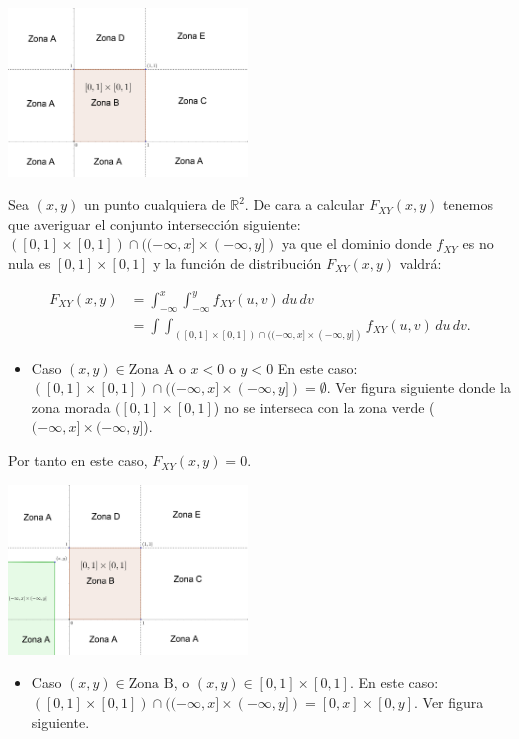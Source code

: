 \documentclass[
  letterpaper,
  DIV=11,
  numbers=noendperiod]{scrreprt}
\providecommand{\tightlist}{%
  \setlength{\itemsep}{0pt}\setlength{\parskip}{0pt}}\usepackage{longtable,booktabs,array}
\begin{document}
\includegraphics[width=2.5in,height=\textheight]{Images/VaUniformeBidi2.png}

Sea \((x,y)\) un punto cualquiera de \(\mathbb{R}^2\). De cara a
calcular \(F_{XY}(x,y)\) tenemos que averiguar el conjunto intersección
siguiente: \(([0,1]\times [0,1])\cap ((-\infty,x]\times (-\infty,y])\)
ya que el dominio donde \(f_{XY}\) es no nula es \([0,1]\times [0,1]\) y
la función de distribución \(F_{XY}(x,y)\) valdrá:

\[
\begin{array}{rl}
F_{XY}(x,y)&=\int_{-\infty}^x\int_{-\infty}^y f_{XY}(u,v)\,du\,dv\\ &=
\int\int_{([0,1]\times [0,1])\cap ((-\infty,x]\times (-\infty,y])} f_{XY}(u,v)\,du\,dv.
\end{array}
\]

\begin{itemize}
\tightlist
\item
  Caso \((x,y)\in \mbox{Zona A}\) o \(x<0\) o \(y<0\) En este caso:
  \(([0,1]\times [0,1])\cap ((-\infty,x]\times (-\infty,y])=\emptyset.\)
  Ver figura siguiente donde la zona morada \(([0,1]\times [0,1]\)) no
  se interseca con la zona verde (\((-\infty,x]\times (-\infty,y]\)).
\end{itemize}

Por tanto en este caso, \(F_{XY}(x,y)=0\).

\includegraphics[width=2.5in,height=\textheight]{Images/VaUniformeBidi3.png}

\begin{itemize}
\tightlist
\item
  Caso \((x,y)\in \mbox{Zona B}\), o \((x,y)\in [0,1]\times [0,1]\). En
  este caso:
  \(([0,1]\times [0,1])\cap ((-\infty,x]\times (-\infty,y])=[0,x]\times [0,y].\)
  Ver figura siguiente.
\end{itemize}
\end{document}
